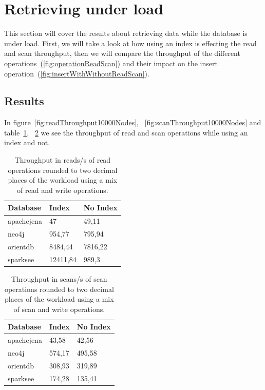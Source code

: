 \section{Retrieving under load}
\label{ch:evaluation:se:retrievingUnderLoad}
This section will cover the results about retrieving data while the database is under load.
First,
we will take a look at how using an index is effecting the read and scan throughput,
then we will compare the throughput of the different operations~(\ref{fig:operationReadScan}) and their impact on the insert operation~(\ref{fig:insertWithWithoutReadScan}).

\subsection{Results}
In figure~\ref{fig:readThroughput10000Nodes},
~\ref{fig:scanThroughput10000Nodes} and table~\ref{tab:readThroughput10000Nodes},
~\ref{tab:scanThroughput10000Nodes} we see the throughput of read and scan operations while using an index and not.

\begin{table}[h!]
  \begin{minipage}{\textwidth}
    \centering
    \begin{tabular}{ | l | l | l | }
      \hline
      Database & Index & No Index \\ \hline
      apachejena & 47 & 49,11 \\ \hline
      neo4j & 954,77 & 795,94 \\ \hline
      orientdb & 8484,44 & 7816,22 \\ \hline
      sparksee & 12411,84 & 989,3 \\ \hline
    \end{tabular}
  \end{minipage}
  \caption{Throughput in reads/s of read operations rounded to two decimal places of the workload using a mix of read and write operations.}
  \label{tab:readThroughput10000Nodes}
\end{table}

\begin{table}[h!]
  \begin{minipage}{\textwidth}
    \centering
    \begin{tabular}{ | l | l | l | }
      \hline
      Database & Index & No Index \\ \hline
      apachejena & 43,58 & 42,56 \\ \hline
      neo4j & 574,17 & 495,58 \\ \hline
      orientdb & 308,93 & 319,89 \\ \hline
      sparksee & 174,28 & 135,41 \\ \hline
    \end{tabular}
  \end{minipage}
  \caption{Throughput in scans/s of scan operations rounded to two decimal places of the workload using a mix of scan and write operations.}
  \label{tab:scanThroughput10000Nodes}
\end{table}

